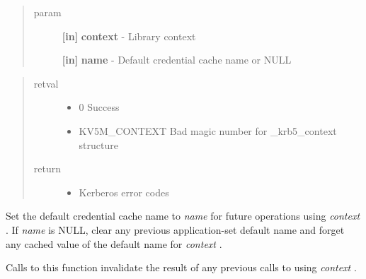 \documentclass[letterpaper,10pt,english]{sphinxmanual}
\begin{document}
\begin{fulllineitems}
\label{appdev/refs/api/krb5_cc_set_default_name:c.krb5_cc_set_default_name}
\end{fulllineitems}

\begin{quote}\begin{description}
\item[{param}] \leavevmode
\textbf{{[}in{]}} \textbf{context} - Library context

\textbf{{[}in{]}} \textbf{name} - Default credential cache name or NULL

\end{description}\end{quote}
\begin{quote}\begin{description}
\item[{retval}] \leavevmode\begin{itemize}
\item {} 
0   Success

\item {} 
KV5M\_CONTEXT   Bad magic number for \_krb5\_context structure

\end{itemize}

\item[{return}] \leavevmode\begin{itemize}
\item {} 
Kerberos error codes

\end{itemize}

\end{description}\end{quote}

Set the default credential cache name to \emph{name} for future operations using \emph{context} . If \emph{name} is NULL, clear any previous application-set default name and forget any cached value of the default name for \emph{context} .

Calls to this function invalidate the result of any previous calls to {\hyperref[appdev/refs/api/krb5_cc_default_name:c.krb5_cc_default_name]{}} using \emph{context} .
\end{document}
